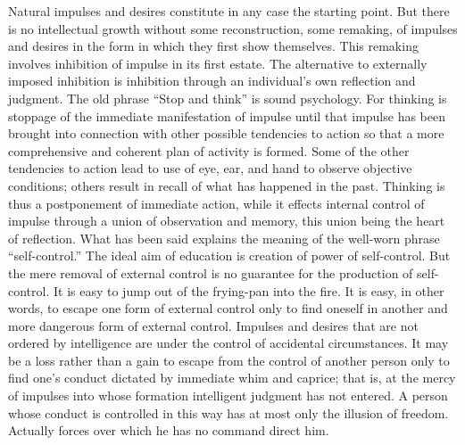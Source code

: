 Natural impulses and desires constitute in any case the starting point. But there is no 
intellectual growth without some reconstruction, some remaking, of impulses and desires 
in the form in which they first show themselves. This remaking involves inhibition of 
impulse in its first estate. The alternative to externally imposed inhibition is inhibition 
through an individual's own reflection and judgment. The old phrase \enquote{Stop and think} is  sound psychology. For thinking is stoppage of the immediate manifestation of impulse 
until that impulse has been brought into connection with other possible tendencies to 
action so that a more comprehensive and coherent plan of activity is formed. Some of the other tendencies to action lead to use of eye, ear, and hand to observe objective 
conditions; others result in recall of what has happened in the past. Thinking is thus a 
postponement of immediate action, while it effects internal control of impulse through a 
union of observation and memory, this union being the heart of reflection. What has been 
said explains the meaning of the well-worn phrase \enquote{self-control.} The ideal aim of 
education is creation of power of self-control. But the mere removal of external control is 
no guarantee for the production of self-control. It is easy to jump out of the frying-pan 
into the fire. It is easy, in other words, to escape one form of external control only to find 
oneself in another and more dangerous form of external control. Impulses and desires that 
are not ordered by intelligence are under the control of accidental circumstances. It may 
be a loss rather than a gain to escape from the control of another person only to find one's 
conduct dictated by immediate whim and caprice; that is, at the mercy of impulses into 
whose formation intelligent judgment has not entered. A person whose conduct is 
controlled in this way has at most only the illusion of freedom. Actually forces over 
which he has no command direct him. 
